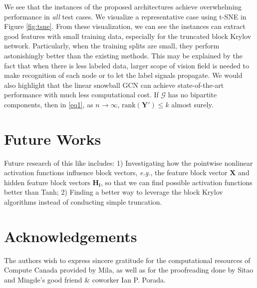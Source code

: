 \documentclass{article}
\newcommand\eg{\textit{e.g.}}
\begin{document}
We see that the instances of the proposed architectures achieve overwhelming performance in \textit{all} test cases. We visualize a representative case using t-SNE \cite{maaten2008visualizing} in Figure \ref{fig:tsne}. From these visualization, we can see the instances can extract good features with small training data, especially for the truncated block Krylov network. Particularly, when the training splits are small, they perform astonishingly better than the existing methods. This may be explained by the fact that when there is less labeled data, larger scope of vision field is needed to make recognition of each node or to let the label signals propagate. We would also highlight that the linear snowball GCN can achieve state-of-the-art performance with much less computational cost.
If $\mathcal{G}$ has no bipartite components, then in \eqref{eq1}, as $n \to \infty$, $\text{rank}(\bm{Y'}) \leq k$ almost surely.



\section{Future Works}
Future research of this like includes: 1) Investigating how the pointwise nonlinear activation functions influence block vectors, \eg{}, the feature block vector $\bm{X}$ and hidden feature block vectors $\bm{H_i}$, so that we can find possible activation functions better than Tanh; 2) Finding a better way to leverage the block Krylov algorithms instead of conducting simple truncation.

\section*{Acknowledgements}
The authors wish to express sincere gratitude for the computational resources of Compute Canada provided by Mila, as well as for the proofreading done by Sitao and Mingde's good friend \& coworker Ian P. Porada.
\clearpage



\newpage
\end{document}
